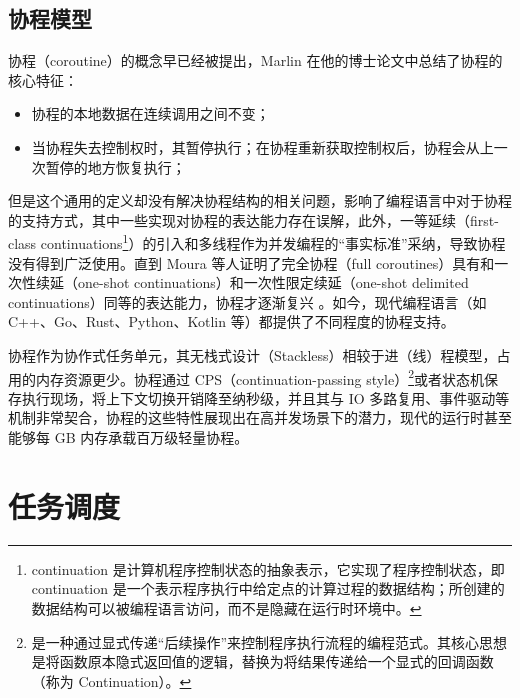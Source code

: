 \subsection{协程模型}

协程（coroutine）的概念早已经被提出，Marlin 在他的博士论文中总结了协程的核心特征\cite{marlin1980coroutines}：
\begin{itemize}
    \item 协程的本地数据在连续调用之间不变；
    \item 当协程失去控制权时，其暂停执行；在协程重新获取控制权后，协程会从上一次暂停的地方恢复执行；
\end{itemize}
但是这个通用的定义却没有解决协程结构的相关问题，影响了编程语言中对于协程的支持方式，其中一些实现对协程的表达能力存在误解，此外，一等延续（first-class continuations\footnote{continuation 是计算机程序控制状态的抽象表示，它实现了程序控制状态，即 continuation 是一个表示程序执行中给定点的计算过程的数据结构；所创建的数据结构可以被编程语言访问，而不是隐藏在运行时环境中。}）的引入和多线程作为并发编程的“事实标准”采纳，导致协程没有得到广泛使用。直到 Moura 等人证明了完全协程（full coroutines）具有和一次性续延（one-shot continuations）和一次性限定续延（one-shot delimited continuations）同等的表达能力，协程才逐渐复兴 \cite{moura2009revisiting}。如今，现代编程语言（如 C++、Go、Rust、Python、Kotlin 等）都提供了不同程度的协程支持。

协程作为协作式任务单元，其无栈式设计（Stackless）相较于进（线）程模型，占用的内存资源更少。协程通过 CPS（continuation-passing style）\footnote{是一种通过显式传递“后续操作”来控制程序执行流程的编程范式。其核心思想是将函数原本隐式返回值的逻辑，替换为将结果传递给一个显式的回调函数（称为 Continuation）。}或者状态机保存执行现场，将上下文切换开销降至纳秒级，并且其与 IO 多路复用、事件驱动等机制非常契合，协程的这些特性展现出在高并发场景下的潜力，现代的运行时甚至能够每 GB 内存承载百万级轻量协程。

\section{任务调度}


